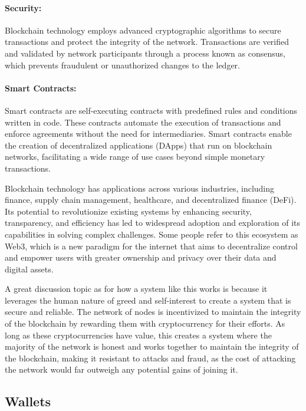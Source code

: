 \paragraph{Security:}
Blockchain technology employs advanced cryptographic algorithms to secure
transactions and protect the integrity of the network. Transactions are
verified and validated by network participants through a process known as
consensus, which prevents fraudulent or unauthorized changes to the ledger.

\paragraph{Smart Contracts:}
Smart contracts are self-executing contracts with predefined rules and
conditions written in code. These contracts automate the execution of
transactions and enforce agreements without the need for intermediaries. Smart
contracts enable the creation of decentralized applications (DApps) that run on
blockchain networks, facilitating a wide range of use cases beyond simple
monetary transactions.

Blockchain technology has applications across various industries, including
finance, supply chain management, healthcare, and decentralized finance (DeFi).
Its potential to revolutionize existing systems by enhancing security,
transparency, and efficiency has led to widespread adoption and exploration of
its capabilities in solving complex challenges. Some people refer to this
ecosystem as Web3, which is a new paradigm for the internet that aims to
decentralize control and empower users with greater ownership and privacy over
their data and digital assets.

A great discussion topic as for how a system like this works is because it
leverages the human nature of greed and self-interest to create a system that
is secure and reliable. The network of nodes is incentivized to maintain the
integrity of the blockchain by rewarding them with cryptocurrency for their
efforts. As long as these cryptocurrencies have value, this creates a system
where the majority of the network is honest and works together to maintain the
integrity of the blockchain, making it resistant to attacks and fraud, as the
cost of attacking the network would far outweigh any potential gains of joining
it.

\subsection{Wallets}
\label{subsec:wallets}

